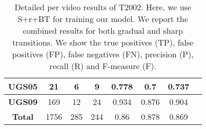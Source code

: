 \documentclass[journal]{IEEEtran}
\begin{document}
\begin{table}[h]
\begin{tabular}{|c|c|c|c|c|c|c|c|}
\textbf{UGS05}      & 21          & 6           & 9           & 0.778      & 0.7        & 0.737      \\ \hline
\textbf{UGS09}      & 169         & 12          & 24          & 0.934      & 0.876      & 0.904      \\ \hline
\textbf{Total}      & 1756        & 285         & 244         & 0.86       & 0.878      & 0.869      \\ \hline
\end{tabular}
\caption{Detailed per video results of T2002. Here, we use S+r+BT for training our model. We report the combined results for both gradual and sharp transitions. We show the true positives (TP), false positives (FP), false negatives (FN), precision (P), recall (R) and F-measure (F).}
\label{2002_07}
\end{table}
\end{document}
